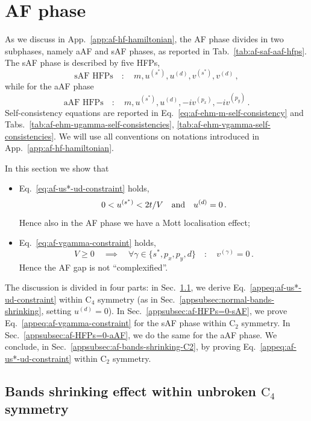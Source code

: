 \section{AF phase}
\label{appappsec:af-constraints}

As we discuss in App.~\ref{app:af-hf-hamiltonian}, the AF phase divides in two subphases, namely aAF and sAF phases, as reported in Tab.~\ref{tab:af-saf-aaf-hfps}. The sAF phase is described by five HFPs,
\[
	\text{sAF HFPs}
	\quad\colon\quad
	m, u^{(s^*)}, u^{(d)}, v^{(s^*)}, v^{(d)} \, ,
\]
while for the aAF phase
\[
	\text{aAF HFPs}
	\quad\colon\quad
	m, u^{(s^*)}, u^{(d)}, -iv^{(p_x)}, -iv^{(p_y)} \, .
\]
Self-consistency equations are reported in Eq.~\eqref{eq:af-ehm-m-self-consistency} and Tabs.~\ref{tab:af-ehm-ugamma-self-consistencies}, \ref{tab:af-ehm-vgamma-self-consistencies}. We will use all conventions on notations introduced in App.~\ref{app:af-hf-hamiltonian}.

In this section we show that
\begin{itemize}
	\item Eq.~\eqref{eq:af-us*-ud-constraint} holds,
	\begin{equation}\label{appeq:af-us*-ud-constraint}
		0 < u^{(s^*)} < 2t/V
		\qq{and}
		u^{(d)} = 0 \, .
	\end{equation}
	Hence also in the AF phase we have a Mott localisation effect;
	\item Eq.~\eqref{eq:af-vgamma-constraint} holds,
	\begin{equation}\label{appeq:af-vgamma-constraint}
		V \ge 0
		\quad\implies\quad
		\forall \gamma \in \lbrace s^*, p_x, p_y, d \rbrace
		\quad\colon\quad
		v^{(\gamma)} = 0 \, .
	\end{equation}
	Hence the AF gap is not ``complexified''.
\end{itemize} 
The discussion is divided in four parts: in Sec.~\ref{appsubsec:af-bands-shrinking}, we derive Eq.~\eqref{appeq:af-us*-ud-constraint} within $\mathrm{C}_4$ symmetry (as in Sec.~\ref{appsubsec:normal-bands-shrinking}, setting $u^{(d)} = 0$). In Sec.~\ref{appsubsec:af-HFPs=0-sAF}, we prove Eq.~\eqref{appeq:af-vgamma-constraint} for the sAF phase within $\mathrm{C}_2$ symmetry. In Sec.~\ref{appsubsec:af-HFPs=0-aAF}, we do the same for the aAF phase. We conclude, in Sec.~\ref{appsubsec:af-bands-shrinking-C2}, by proving Eq.~\eqref{appeq:af-us*-ud-constraint} within $\mathrm{C}_2$ symmetry.

\subsection{Bands shrinking effect within unbroken $\mathrm{C}_4$ symmetry}\label{appsubsec:af-bands-shrinking}

